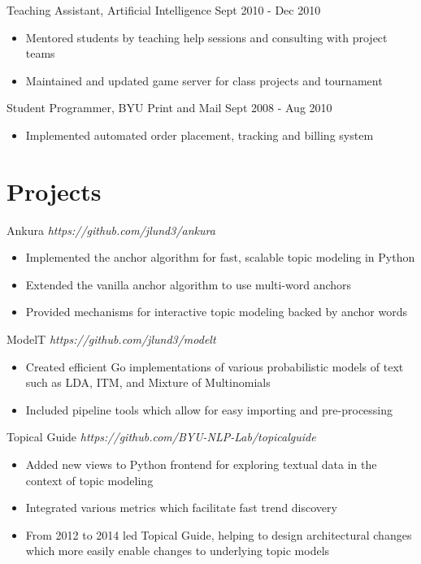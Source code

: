 \documentclass[margin]{res}
\begin{document}
\begin{resume}
Teaching Assistant, Artificial Intelligence \hfill Sept 2010 - Dec 2010
\begin{itemize} \itemsep -2pt
\item Mentored students by teaching help sessions and consulting with project teams
\item Maintained and updated game server for class projects and tournament
\end{itemize}

Student Programmer, BYU Print and Mail \hfill Sept 2008 - Aug 2010
\begin{itemize} \itemsep -2pt
\item Implemented automated order placement, tracking and billing system
\end{itemize}

\section{Projects}

Ankura \hfill {\it https://github.com/jlund3/ankura}
\begin{itemize}
\item Implemented the anchor algorithm for fast, scalable topic modeling in Python
\item Extended the vanilla anchor algorithm to use multi-word anchors
\item Provided mechanisms for interactive topic modeling backed by anchor words
\end{itemize}

ModelT \hfill {\it https://github.com/jlund3/modelt}
\begin{itemize}
\item Created efficient Go implementations of various probabilistic models of text such as LDA, ITM, and Mixture of Multinomials
\item Included pipeline tools which allow for easy importing and pre-processing
\end{itemize}

Topical Guide \hfill {\it https://github.com/BYU-NLP-Lab/topicalguide}
\begin{itemize}
\item Added new views to Python frontend for exploring textual data in the
context of topic modeling
\item Integrated various metrics which facilitate fast trend discovery
\item From 2012 to 2014 led Topical Guide, helping to design architectural
changes which more easily enable changes to underlying topic models
\end{itemize}



\end{resume}
\end{document}
